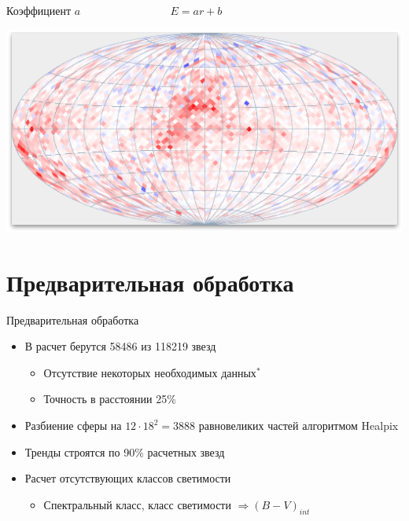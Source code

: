 \documentclass[14pt, fleqn, xcolor={dvipsnames, table}]{beamer}
\begin{document}
        \begin{frame}{Коэффициент $a$ ~~~~~~~~~~~~~~~ $E = a r + b$}
            \begin{center}
                \includegraphics[scale=0.32]{map-a-white.png}
            \end{center}             
        \end{frame}

    \section{Предварительная обработка}                
        
        \begin{frame}{Предварительная обработка}
            \begin{itemize}
                \item В расчет берутся 58486 из 118219 звезд
                \begin{itemize}
                    \item Отсутствие некоторых необходимых данных$^*$
                    \item Точность в расстоянии 25\%
                \end{itemize}
                \item Разбиение сферы на $12 \cdot 18^2 = 3888$ равновеликих частей алгоритмом Healpix
                \item Тренды строятся по 90\% расчетных звезд
                \item Расчет отсутствующих классов светимости
                \begin{itemize}
                    \item Спектральный класс, класс светимости $\Longrightarrow (B - V)_{int}$
                \end{itemize}
            \end{itemize}
        \end{frame}
        
\end{document}
